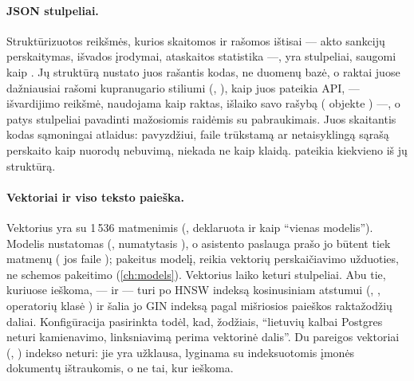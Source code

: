 \paragraph{JSON stulpeliai.} Struktūrizuotos reikšmės, kurios skaitomos ir rašomos ištisai ---
akto sankcijų perskaitymas, išvados įrodymai, ataskaitos statistika ---, yra
 stulpeliai, saugomi kaip . Jų struktūrą nustato juos rašantis
kodas, ne duomenų bazė, o raktai juose dažniausiai rašomi kupranugario stiliumi
(, ), kaip juos pateikia API, --- išvardijimo reikšmė,
naudojama kaip raktas, išlaiko savo rašybą ( objekte )
---, o patys stulpeliai pavadinti mažosiomis raidėmis su pabraukimais. Juos skaitantis kodas sąmoningai
atlaidus: pavyzdžiui,  faile  trūkstamą
ar netaisyklingą sąrašą perskaito kaip nuorodų nebuvimą, niekada ne kaip klaidą.
pateikia kiekvieno iš jų struktūrą.

\paragraph{Vektoriai ir viso teksto paieška.} Vektorius yra  su 1\,536
matmenimis (, deklaruota  ir
 kaip \enquote{vienas modelis}). Modelis nustatomas
 (, numatytasis
), o asistento paslauga prašo jo būtent tiek
matmenų ( jos faile ); pakeitus modelį,
reikia vektorių perskaičiavimo užduoties, ne schemos pakeitimo (\cref{ch:models}). Vektorius
laiko keturi stulpeliai. Abu tie, kuriuose ieškoma, ---  ir
 --- turi po HNSW indeksą kosinusiniam atstumui
(, , operatorių klasė ) ir šalia jo
GIN indeksą pagal  mišriosios paieškos raktažodžių daliai.
Konfigūracija  pasirinkta todėl, kad,  žodžiais,
\enquote{lietuvių kalbai Postgres neturi kamienavimo, linksniavimą perima vektorinė dalis}. Du
pareigos vektoriai (, ) indekso neturi: jie yra užklausa,
lyginama su indeksuotomis įmonės dokumentų ištraukomis, o ne tai, kur ieškoma.

